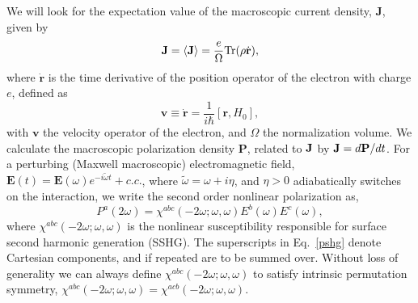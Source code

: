 \documentclass[floatfix,prb,aps,superscriptaddress,11pt,preprint,letterpaper]{revtex4}
\def\chon{black}
\begin{document}
We will look for the expectation value of the macroscopic current density, 
$\mathbf{J}$, given by 
\begin{equation}
\mathbf{J}=\langle{\mathbf{J}}\rangle=\frac{e}{\Omega}\mbox{Tr}({\rho}\dot{\mathbf{r}})
,
\label{pe}
\end{equation}
where $\dot{\mathbf{r}}$ is the time derivative of the position operator of the
electron {\color{\chon} with} charge $e$, {\color{\chon} defined as}
\begin{equation}
\mathbf{v}\equiv \dot{\mathbf{r}}=\frac{1}{i\hbar }[\mathbf{r},H_0],  
\label{mv}
\end{equation}
with $\mathbf{v}$ the velocity operator of the electron, and $\Omega$ the
normalization volume. We calculate the macroscopic polarization density 
$\mathbf{P}$, related to $\mathbf{J}$ by
$\mathbf{J}=d\mathbf{P}/dt$. For a 
perturbing (Maxwell macroscopic) electromagnetic field, $\mathbf{E}(t)=
\mathbf{E}(\omega )e^{-i\tilde{\omega} t}+c.c.$,
where $\tilde\omega=\omega+i\eta $,
and $\eta >0$ {\color{\chon} adiabatically switches on} the interaction,
we write the second order nonlinear
polarization as, 
\begin{equation}
P^a(2\omega)=\chi ^{abc}(-2\omega;\omega,\omega)E^{b}(\omega)E^{c}(\omega),  
\label{pshg}
\end{equation}
where $\chi^{abc}(-2\omega ;\omega ,\omega )$ is the nonlinear
susceptibility responsible {\color{\chon} for} surface second harmonic generation
(SSHG). 
The 
superscripts in Eq.~\eqref{pshg} denote Cartesian components, and if
repeated are to be summed over. Without loss of generality we can always
define $\chi^{abc}(-2\omega;\omega,\omega)$
 to satisfy intrinsic permutation
symmetry, 
$\chi^{abc}(-2\omega ;\omega ,\omega )=\chi ^{acb}(-2\omega ;\omega
,\omega )$.
\end{document}
